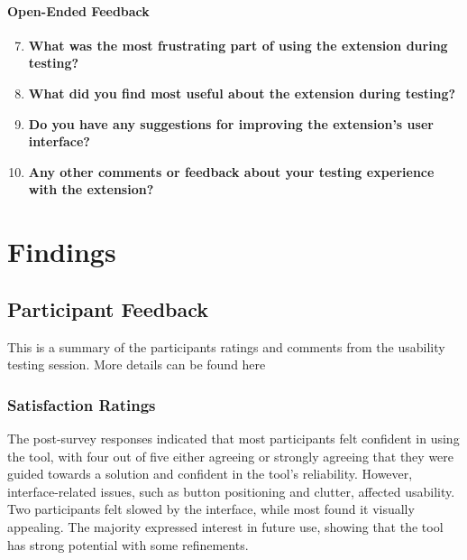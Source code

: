 \documentclass{article}
\begin{document}
\paragraph{Open-Ended Feedback}
\begin{enumerate}
    \setcounter{enumi}{6}
    \item \textbf{What was the most frustrating part of using the extension during testing?} \\
    \underline{\hspace{15cm}}
    
    \item \textbf{What did you find most useful about the extension during testing?} \\
    \underline{\hspace{15cm}}
    
    \item \textbf{Do you have any suggestions for improving the extension's user interface?} \\
    \underline{\hspace{15cm}}
    
    \item \textbf{Any other comments or feedback about your testing experience with the extension?} \\
    \underline{\hspace{15cm}}
\end{enumerate}


\newpage
\section{Findings}

\subsection{Participant Feedback}
This is a summary of the participants ratings and comments from the usability testing session. More details can be found here {}
\subsubsection{Satisfaction Ratings}
The post-survey responses indicated that most participants felt confident in using the tool, with four out of five either agreeing or strongly agreeing that they were guided towards a solution and confident in the tool's reliability. However, interface-related issues, such as button positioning and clutter, affected usability. Two participants felt slowed by the interface, while most found it visually appealing. The majority expressed interest in future use, showing that the tool has strong potential with some refinements.
\end{document}
